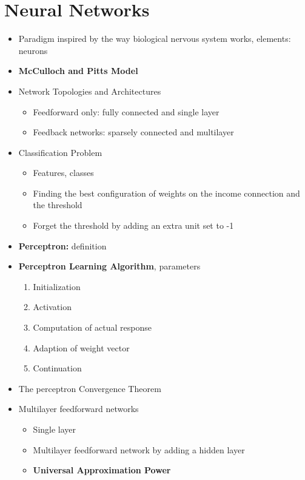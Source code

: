 \chapter{Neural Networks}
\begin{itemize}
    \item Paradigm inspired by the way biological nervous system works, elements: neurons
    \item \textbf{McCulloch and Pitts Model}
    \item Network Topologies and Architectures
    \begin{itemize}
        \item Feedforward only: fully connected and single layer
        \item Feedback networks: sparsely connected and multilayer
    \end{itemize}
    \item Classification Problem
    \begin{itemize}
        \item Features, classes
        \item Finding the best configuration of weights on the income connection and the threshold
        \item Forget the threshold by adding an extra unit set to -1
    \end{itemize}
    \item \textbf{Perceptron:} definition
    \item \textbf{Perceptron Learning Algorithm}, parameters
    \begin{enumerate}
        \item Initialization
        \item Activation
        \item Computation of actual response
        \item Adaption of weight vector
        \item Continuation
    \end{enumerate}
    \item The perceptron Convergence Theorem
    \item Multilayer feedforward networks
    \begin{itemize}
        \item Single layer
        \item Multilayer feedforward network by adding a hidden layer
        \item \textbf{Universal Approximation Power}
    \end{itemize}

\end{itemize}
